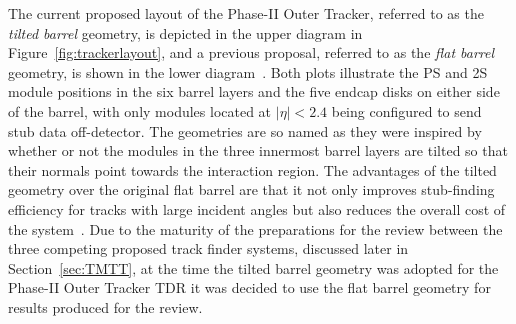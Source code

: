 The current proposed layout of the Phase-II Outer Tracker, referred to as the \emph{tilted barrel} geometry, is depicted in the upper diagram in Figure~\ref{fig:trackerlayout}, and a previous proposal, referred to as the \emph{flat barrel} geometry, is shown in the lower diagram~\cite{CMS_Upgrade_TP}.
Both plots illustrate the PS and 2S module positions in the six barrel layers and the five endcap disks on either side of the barrel, with only modules located at $|\eta| < 2.4$ being configured to send stub data off-detector.
The geometries are so named as they were inspired by whether or not the modules in the three innermost barrel layers are tilted so that their normals point towards the interaction region.
The advantages of the tilted geometry over the original flat barrel are that it not only improves stub-finding efficiency for tracks with large incident angles but also reduces the overall cost of the system~\cite{P2TrackerTDR}.
Due to the maturity of the preparations for the review between the three competing proposed track finder systems, discussed later in Section~\ref{sec:TMTT}, at the time the tilted barrel geometry was adopted for the Phase-II Outer Tracker TDR it was decided to use the flat barrel geometry for results produced for the review.

